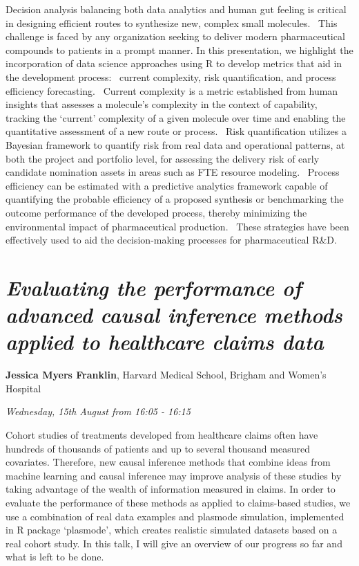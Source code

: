 \documentclass[]{book}
\theoremstyle{definition}
\theoremstyle{definition}
\theoremstyle{definition}
\theoremstyle{remark}
\begin{document}
Decision analysis balancing both data analytics and human gut feeling is
critical in designing efficient routes to synthesize new, complex small
molecules.~ This challenge is faced by any organization seeking to
deliver modern pharmaceutical compounds to patients in a prompt manner.
In this presentation, we highlight the incorporation of data science
approaches using R to develop metrics that aid in the development
process:~ current complexity, risk quantification, and process
efficiency forecasting.~ Current complexity is a metric established from
human insights that assesses a molecule's complexity in the context of
capability, tracking the `current' complexity of a given molecule over
time and enabling the quantitative assessment of a new route or
process.~ Risk quantification utilizes a Bayesian framework to quantify
risk from real data and operational patterns, at both the project and
portfolio level, for assessing the delivery risk of early candidate
nomination assets in areas such as FTE resource modeling.~ Process
efficiency can be estimated with a predictive analytics framework
capable of quantifying the probable efficiency of a proposed synthesis
or benchmarking the outcome performance of the developed process,
thereby minimizing the environmental impact of pharmaceutical
production.~ These strategies have been effectively used to aid the
decision-making processes for pharmaceutical R\&D.

\hypertarget{evaluating-the-performance-of-advanced-causal-inference-methods-applied-to-healthcare-claims-data-1}{%
\section{\texorpdfstring{\emph{Evaluating the performance of advanced
causal inference methods applied to healthcare claims
data}}{Evaluating the performance of advanced causal inference methods applied to healthcare claims data}}\label{evaluating-the-performance-of-advanced-causal-inference-methods-applied-to-healthcare-claims-data-1}}

\textbf{Jessica Myers Franklin}, Harvard Medical School, Brigham and
Women's Hospital

\emph{Wednesday, 15th August from 16:05 - 16:15}

Cohort studies of treatments developed from healthcare claims often have
hundreds of thousands of patients and up to several thousand measured
covariates. Therefore, new causal inference methods that combine ideas
from machine learning and causal inference may improve analysis of these
studies by taking advantage of the wealth of information measured in
claims. In order to evaluate the performance of these methods as applied
to claims-based studies, we use a combination of real data examples and
plasmode simulation, implemented in R package `plasmode', which creates
realistic simulated datasets based on a real cohort study. In this talk,
I will give an overview of our progress so far and what is left to be
done.
\end{document}
